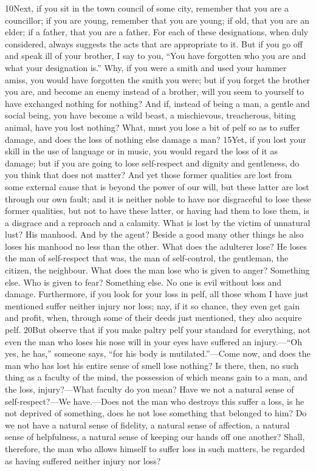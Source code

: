 10Next, if you sit in the town council of some city, remember that you are a councillor; if you are young, remember that you are young; if old, that you are an elder; if a father, that you are a father. For each of these designations, when duly considered, always suggests the acts that are appropriate to it. But if you go off and speak ill of your brother, I say to you, ``You have forgotten who you are and what your designation is.'' Why, if you were a smith and used your hammer amiss, you would have forgotten the smith you were; but if you forget the brother you are, and become an enemy instead of a brother, will you seem to yourself to have exchanged nothing for nothing? And if, instead of being a man, a gentle and social being, you have become a wild beast, a mischievous, treacherous, biting animal, have you lost nothing? What, must you lose a bit of pelf so as to suffer damage, and does the loss of nothing else damage a man? 15Yet, if you lost your skill in the use of language or in music, you would regard the loss of it as damage; but if you are going to lose self-respect and dignity and gentleness, do you think that does not matter? And yet those former qualities are lost from some external cause that is beyond the power of our will, but these latter are lost through our own fault; and it is neither noble to have nor disgraceful to lose these former qualities, but not to have these latter, or having had them to lose them, is a disgrace and a reproach and a calamity. What is lost by the victim of unnatural lust? His manhood. And by the agent? Beside a good many other things he also loses his manhood no less than the other. What does the adulterer lose? He loses the man of self-respect that was, the man of self-control, the gentleman, the citizen, the neighbour. What does the man lose who is given to anger? Something else. Who is given to fear? Something else. No one is evil without loss and damage. Furthermore, if you look for your loss in pelf, all those whom I have just mentioned suffer neither injury nor loss; nay, if it so chance, they even get gain and profit, when, through some of their deeds just mentioned, they also acquire pelf. 20But observe that if you make paltry pelf your standard for everything, not even the man who loses his nose will in your eyes have suffered an injury.—``Oh yes, he has,'' someone says, ``for his body is mutilated.''—Come now, and does the man who has lost his entire sense of smell lose nothing? Is there, then, no such thing as a faculty of the mind, the possession of which means gain to a man, and the loss, injury?—What faculty do you mean? Have we not a natural sense of self-respect?—We have.—Does not the man who destroys this suffer a loss, is he not deprived of something, does he not lose something that belonged to him? Do we not have a natural sense of fidelity, a natural sense of affection, a natural sense of helpfulness, a natural sense of keeping our hands off one another? Shall, therefore, the man who allows himself to suffer loss in such matters, be regarded as having suffered neither injury nor loss?

